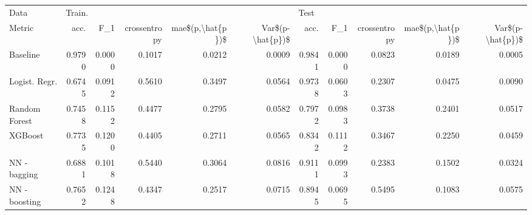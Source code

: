 \begin{tabular}{lrrrrrrrrrr}
\toprule
Data & \multicolumn{5}{l}{Train.} & \multicolumn{5}{l}{Test} \\
Metric &    acc. &     F\_1 & crossentropy & mae\$(p,\textbackslash hat\{p\})\$ & Var\$(p-\textbackslash hat\{p\})\$ &    acc. &     F\_1 & crossentropy & mae\$(p,\textbackslash hat\{p\})\$ & Var\$(p-\textbackslash hat\{p\})\$ \\
\midrule
Baseline      &  0.9790 &  0.0000 &       0.1017 &           0.0212 &           0.0009 &  0.9841 &  0.0000 &       0.0823 &           0.0189 &           0.0005 \\
Logist. Regr. &  0.6745 &  0.0912 &       0.5610 &           0.3497 &           0.0564 &  0.9738 &  0.0603 &       0.2307 &           0.0475 &           0.0090 \\
Random Forest &  0.7458 &  0.1152 &       0.4477 &           0.2795 &           0.0582 &  0.7972 &  0.0983 &       0.3738 &           0.2401 &           0.0517 \\
XGBoost       &  0.7735 &  0.1200 &       0.4405 &           0.2711 &           0.0565 &  0.8342 &  0.1112 &       0.3467 &           0.2250 &           0.0459 \\
NN - bagging  &  0.6881 &  0.1018 &       0.5440 &           0.3064 &           0.0816 &  0.9111 &  0.0993 &       0.2383 &           0.1502 &           0.0324 \\
NN - boosting &  0.7652 &  0.1248 &       0.4347 &           0.2517 &           0.0715 &  0.8945 &  0.0695 &       0.5495 &           0.1083 &           0.0575 \\
\bottomrule
\end{tabular}
